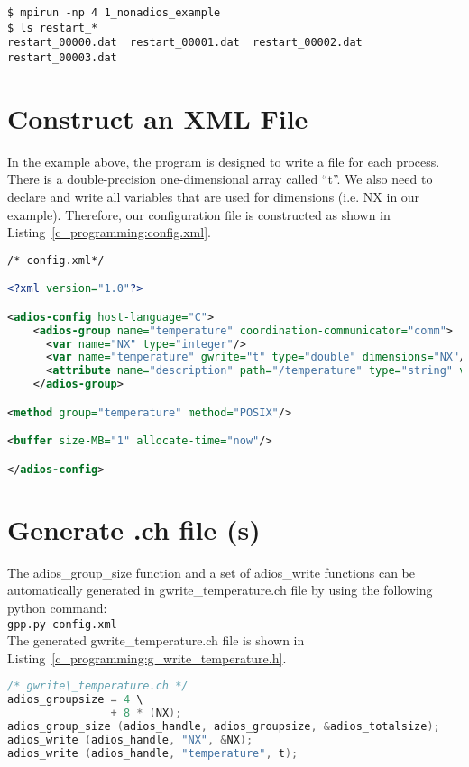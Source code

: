\begin{lstlisting}[]
$ mpirun -np 4 1_nonadios_example
$ ls restart_*
restart_00000.dat  restart_00001.dat  restart_00002.dat  restart_00003.dat
\end{lstlisting}

\section{Construct an XML File}

In the example above, the program is designed to write a file for each process. 
There is a double-precision one-dimensional array called ``t''. We also need to 
declare and write all variables that are used for dimensions (i.e. NX in our example). 
Therefore, our configuration file is constructed as shown in Listing~\ref{c_programming:config.xml}.

\begin{lstlisting}[language=XML,caption=Example config.xml]
/* config.xml*/

<?xml version="1.0"?>

<adios-config host-language="C">
    <adios-group name="temperature" coordination-communicator="comm">
      <var name="NX" type="integer"/>
      <var name="temperature" gwrite="t" type="double" dimensions="NX"/>
      <attribute name="description" path="/temperature" type="string" value="Temperature array" />
    </adios-group>

<method group="temperature" method="POSIX"/>

<buffer size-MB="1" allocate-time="now"/>

</adios-config>
\end{lstlisting}\label{c_programming:config.xml}

\section{Generate .ch file (s)}

The adios\_group\_size function and a set of adios\_write functions can be automatically 
generated in gwrite\_temperature.ch file by using the following python command: 
\\
\texttt{gpp.py config.xml}
\\

The generated gwrite\_temperature.ch file is shown in Listing~\ref{c_programming:g_write_temperature.h}.

\begin{lstlisting}[language=C,caption=Example gwrite\_temperature.ch]
/* gwrite\_temperature.ch */
adios_groupsize = 4 \
                + 8 * (NX);
adios_group_size (adios_handle, adios_groupsize, &adios_totalsize);
adios_write (adios_handle, "NX", &NX);
adios_write (adios_handle, "temperature", t);
\end{lstlisting}\label{c_programming:g_write_temperature.h}

